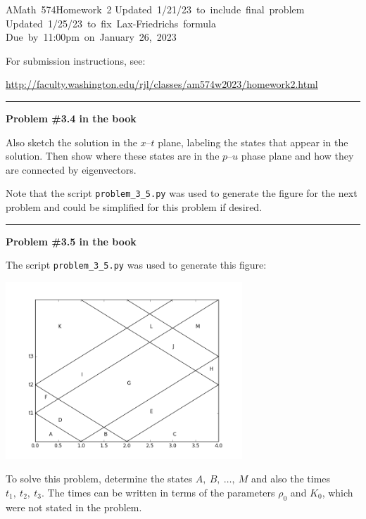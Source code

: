 \documentclass[11pt]{article}
\begin{document}
\hfill\vbox{\hbox{AMath 574}\hbox{Homework 2}
\hbox{Updated 1/21/23 to include final problem}
\hbox{Updated 1/25/23 to fix Lax-Friedrichs formula}
\hbox{Due by 11:00pm on January 26, 2023}}

For submission instructions, see:

\url{http://faculty.washington.edu/rjl/classes/am574w2023/homework2.html}

\vskip 1cm
\hrule
{\bf Problem \#3.4 in the book}

Also sketch the solution in the $x$--$t$ plane, labeling the states that
appear in the solution. Then show where these states are in the $p$--$u$
phase plane and how they are connected by eigenvectors.

Note that the script \verb+problem_3_5.py+ was used to generate the figure
for the next problem and could be simplified for this problem if desired.





\vskip 1cm
\hrule
{\bf Problem \#3.5 in the book}

The script \verb+problem_3_5.py+ was used to generate this figure:

\hfil\includegraphics[width=3.5in]{problem_3_5.png}\hfil

To solve this problem, determine the states $A,~ B, ~ \ldots,~ M$ and also
the times $t_1,~t_2,~t_3$.  The times can be written in terms of the
parameters $\rho_0$ and $K_0$, which were not stated in the problem.
\end{document}
